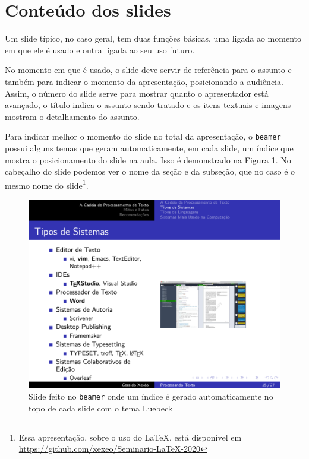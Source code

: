 \section{Conteúdo dos slides}

Um slide típico, no caso geral, tem duas funções básicas, uma ligada ao momento em que ele é usado e outra ligada ao seu uso futuro.

No momento em que é usado, o slide deve servir de referência para o assunto e também para indicar o momento da apresentação, posicionando a audiência. Assim, o número do slide serve para mostrar quanto o apresentador está avançado, o título indica o assunto sendo tratado e os itens textuais e imagens mostram o detalhamento do assunto.

Para indicar melhor o momento do slide no total da apresentação, o \texttt{beamer} possui alguns temas que geram automaticamente, em cada slide, um índice que mostra o posicionamento do slide na aula. Isso é demonstrado na Figura \ref{fig:sistemas}. No cabeçalho do slide podemos ver o nome da seção e da subseção, que no caso é o mesmo nome do slide\footnote{Essa apresentação, sobre o uso do \LaTeX, está disponível em \url{https://github.com/xexeo/Seminario-LaTeX-2020}}.

\begin{figure}[tbh]
    \centering
    \includegraphics[width=\tam\linewidth,frame]{imagens/sistemas}
    \caption{Slide feito no \texttt{beamer} onde um índice é gerado automaticamente no topo de cada slide com o tema Luebeck}
    \label{fig:sistemas}
\end{figure}

